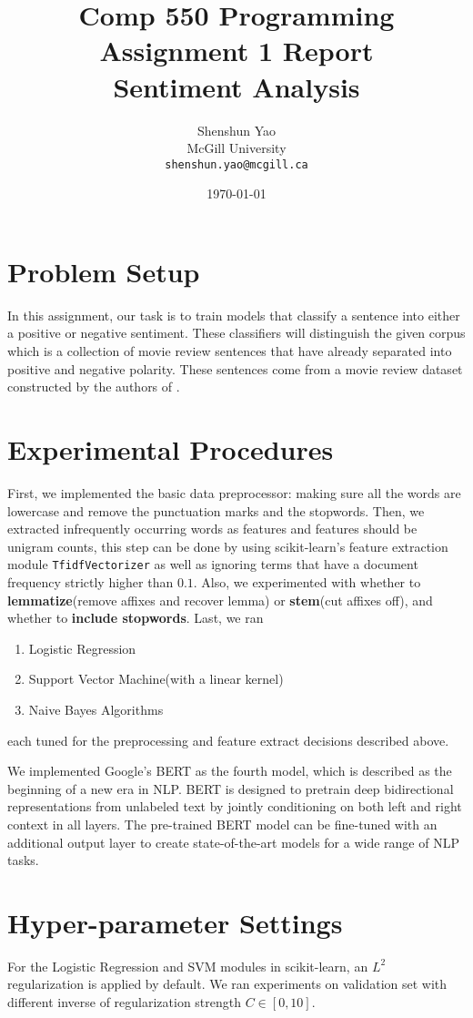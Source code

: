 \documentclass[10pt]{article}
\title{Comp 550 Programming Assignment 1 Report \\ Sentiment Analysis}
\author{Shenshun Yao \\
  McGill University \\
  {\tt shenshun.yao@mcgill.ca} \\}
\date{\today}
\begin{document}
\maketitle
\section{Problem Setup}
  In this assignment, our task is to train models that classify a sentence into either a positive or negative sentiment. These classifiers will distinguish the given corpus which is a collection of movie review sentences that have already separated into positive and negative polarity. These sentences come from a movie review dataset constructed by the authors of \cite{pang-lee-2005-seeing}.
\section{Experimental Procedures}
First, we implemented the basic data preprocessor: making sure all the words are lowercase and remove the punctuation marks and the stopwords. Then, we extracted infrequently occurring words as features and features should be unigram counts, this step can be done by using scikit-learn’s feature extraction module {\tt TfidfVectorizer} as well as ignoring terms that have a document frequency strictly higher than $0.1$. Also, we experimented with whether to \textbf{lemmatize}(remove affixes and recover lemma) or \textbf{stem}(cut affixes off), and whether to \textbf{include stopwords}. Last, we ran
\begin{enumerate}
    \item Logistic Regression
    \item Support Vector Machine(with a linear kernel) 
    \item Naive Bayes Algorithms
\end{enumerate} each tuned for the preprocessing and feature extract decisions described above.

We implemented Google's BERT\cite{devlin2019bert} as the fourth model, which is described as the beginning of a new era in NLP. BERT is designed to pretrain deep bidirectional representations from unlabeled text by jointly conditioning on both left and right context in all layers. The pre-trained BERT model can be fine-tuned with an additional output layer to create state-of-the-art models for a wide range of NLP tasks.
\section{Hyper-parameter Settings}
For the Logistic Regression and SVM modules in scikit-learn, an $L^2$ regularization is applied by default. We ran experiments on validation set with different inverse of regularization strength $C \in [0,10]$. 
\end{document}
